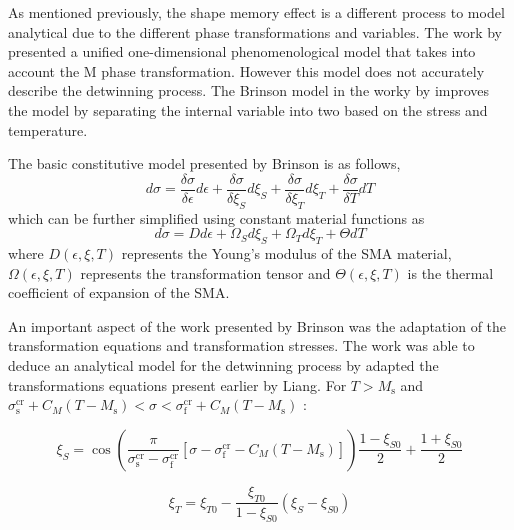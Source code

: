 As mentioned previously, the shape memory effect is a different process to model analytical due to the different phase transformations and variables. The work by \cite{liangDesignShapeMemory1997} presented a unified one-dimensional phenomenological model that takes into account the M phase transformation. However this model does not accurately describe the detwinning process. The Brinson model in the worky by \cite{brinsonOneDimensionalConstitutiveBehavior1993} improves the model by separating the internal variable into two based on the stress and temperature.

The basic constitutive model presented by Brinson is as follows,
\begin{equation}
  \label{eq:brinson_model_1}
  d\sigma = \frac{\delta\sigma}{\delta\epsilon}d\epsilon + \frac{\delta\sigma}{\delta\xi_S}d\xi_S + \frac{\delta\sigma}{\delta\xi_T}d\xi_T + \frac{\delta\sigma}{\delta T}dT
\end{equation}
 which can be further simplified using constant material functions as
\begin{equation}
  \label{eq:brinson_model_2}
  d\sigma = Dd\epsilon + \Omega_Sd\xi_S + \Omega_Td\xi_T + \Theta dT
\end{equation}
where $D(\epsilon,\xi,T)$ represents the Young's modulus of the SMA material, $\Omega(\epsilon,\xi,T)$ represents the transformation tensor and $\Theta(\epsilon,\xi,T)$ is the thermal coefficient of expansion of the SMA.

An important aspect of the work presented by Brinson was the adaptation of the transformation equations and transformation stresses. The work was able to deduce an analytical model for the detwinning process by adapted the transformations equations present earlier by Liang. For $T > M_\mathrm{s}$ and $\sigma_\mathrm{s}^\mathrm{cr} + C_M(T - M_\mathrm{s}) < \sigma < \sigma_\mathrm{f}^\mathrm{cr} + C_M(T-M_\mathrm{s})$ :

\begin{equation}
  \label{eq:brinson_conv_xis}
  \xi_S = \cos\left(\frac{\pi}{\sigma_\mathrm{s}^\mathrm{cr}-\sigma_\mathrm{f}^\mathrm{cr}}[\sigma - \sigma_\mathrm{f}^\mathrm{cr} - C_M(T-M_\mathrm{s})]\right)\frac{1-\xi_{S0}}{2} + \frac{1+\xi_{S0}}{2}
\end{equation}

\begin{equation}
  \label{eq:brinson_conv_xit}
  \xi_T = \xi_{T0} - \frac{\xi_{T0}}{1-\xi_{S0}}(\xi_S-\xi_{S0})
\end{equation}

